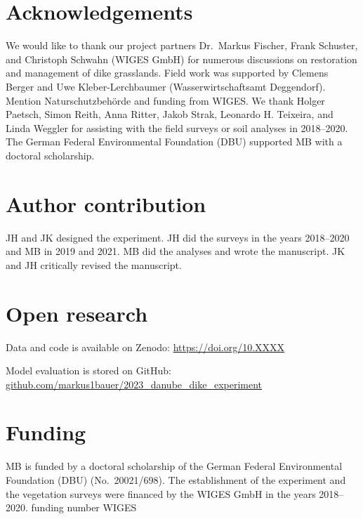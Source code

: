 \documentclass[
]{article}
\begin{document}
\hypertarget{acknowledgements}{%
\section*{Acknowledgements}\label{acknowledgements}}

We would like to thank our project partners Dr.~Markus Fischer, Frank Schuster, and Christoph Schwahn (WIGES GmbH) for numerous discussions on restoration and management of dike grasslands. Field work was supported by Clemens Berger and Uwe Kleber-Lerchbaumer (Wasserwirtschaftsamt Deggendorf). Mention Naturschutzbehörde and funding from WIGES. We thank Holger Paetsch, Simon Reith, Anna Ritter, Jakob Strak, Leonardo H. Teixeira, and Linda Weggler for assisting with the field surveys or soil analyses in 2018--2020. The German Federal Environmental Foundation (DBU) supported MB with a doctoral scholarship.

\hypertarget{author-contribution}{%
\section*{Author contribution}\label{author-contribution}}

JH and JK designed the experiment. JH did the surveys in the years 2018--2020 and MB in 2019 and 2021. MB did the analyses and wrote the manuscript. JK and JH critically revised the manuscript.

\hypertarget{open-research}{%
\section*{Open research}\label{open-research}}

Data and code is available on Zenodo: \url{https://doi.org/10.XXXX}

Model evaluation is stored on GitHub: \href{https://github.com/markus1bauer/2023_danube_dike_experiment/tree/main/markdown}{github.com/markus1bauer/2023\_danube\_dike\_experiment}

\hypertarget{funding}{%
\section*{Funding}\label{funding}}

MB is funded by a doctoral scholarship of the German Federal Environmental Foundation (DBU) (No.~20021/698). The establishment of the experiment and the vegetation surveys were financed by the WIGES GmbH in the years 2018--2020. funding number WIGES
\end{document}
